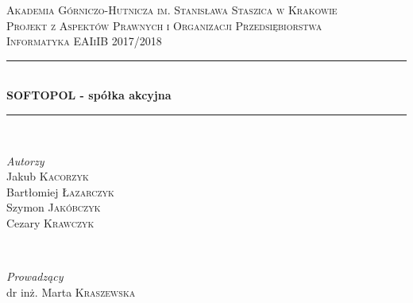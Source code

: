 \documentclass[11pt]{article}
\begin{document}
	
	\begin{titlepage} 
	
		\newcommand{\HRule}{\rule{\linewidth}{0.5mm}} %
		
		\center %
		
		
		\textsc{\LARGE Akademia Górniczo-Hutnicza im. Stanisława Staszica w Krakowie}\\[1.5cm] %
		
		\textsc{\Large Projekt z Aspektów Prawnych i Organizacji Przedsiębiorstwa}\\[0.5cm] %
		
		\textsc{\large Informatyka EAIiIB 2017/2018}\\[0.5cm] %
		
		
		\HRule\\[0.4cm]
		
		{\huge\bfseries SOFTOPOL - spółka akcyjna}\\[0.4cm] %
		
		\HRule\\[1.5cm]
		
		
		\begin{minipage}{0.4\textwidth}
			\begin{flushleft}
				\large
				\textit{Autorzy}\\
				Jakub \textsc{Kacorzyk} \\
				Bartłomiej \textsc{Łazarczyk} \\
				Szymon \textsc{Jakóbczyk} \\
				Cezary \textsc{Krawczyk} 
			\end{flushleft}
		\end{minipage}
		~
		\begin{minipage}{0.4\textwidth}
			\begin{flushright}
				\large
				\textit{Prowadzący}\\
				dr inż. Marta \textsc{Kraszewska} %
			\end{flushright}
		\end{minipage}
		

\end{titlepage}
\end{document}
